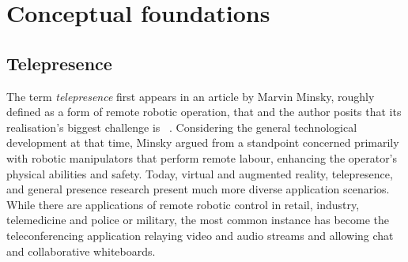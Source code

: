 \chapter{Conceptual foundations}
\label{ch:conceptualfoundations}

\section{Telepresence}\label{sec:telepresence}

The term \emph{telepresence} first appears in an article by Marvin Minsky, roughly defined as a form of remote robotic operation, that  and the author posits that its realisation's biggest challenge is ~\parencite{minskyTelepresence}.
Considering the general technological development at that time, Minsky argued from a standpoint concerned primarily with robotic manipulators that perform remote labour, enhancing the operator's physical abilities and safety.
Today, virtual and augmented reality, telepresence, and general presence research present much more diverse application scenarios.
While there are applications of remote robotic control in retail, industry, telemedicine and police or military, the most common instance has become the teleconferencing application relaying video and audio streams and allowing chat and collaborative whiteboards.

